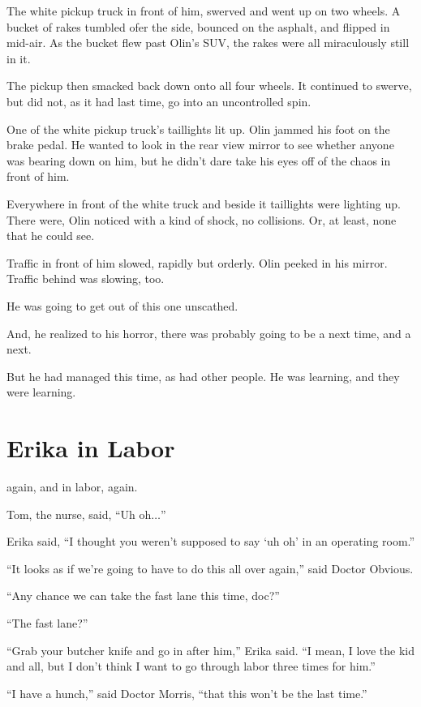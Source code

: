 The white pickup truck in front of him, swerved and went up on two wheels. A bucket of rakes tumbled ofer the side, bounced on the asphalt, and flipped in mid-air. As the bucket flew past Olin's SUV, the rakes were all miraculously still in it.

The pickup then smacked back down onto all four wheels. It continued to swerve, but did not, as it had last time, go into an uncontrolled spin.

One of the white pickup truck's taillights lit up. Olin jammed his foot on the brake pedal. He wanted to look in the rear view mirror to see whether anyone was bearing down on him, but he didn't dare take his eyes off of the chaos in front of him.

Everywhere in front of the white truck and beside it taillights were lighting up. There were, Olin noticed with a kind of shock, no collisions. Or, at least, none that he could see.

Traffic in front of him slowed, rapidly but orderly. Olin peeked in his mirror. Traffic behind was slowing, too.

He was going to get out of this one unscathed.

And, he realized to his horror, there was probably going to be a next time, and a next.

But he had managed this time, as had other people. He was learning, and they were learning.



\chapter{Erika in Labor}

 again, and in labor, again.

Tom, the nurse, said, ``Uh oh$\ldots$''

Erika said, ``I thought you weren't supposed to say `uh oh' in an operating room.''

``It looks as if we're going to have to do this all over again,'' said Doctor Obvious.

``Any chance we can take the fast lane this time, doc?''

``The fast lane?''

``Grab your butcher knife and go in after him,'' Erika said. ``I mean, I love the kid and all, but I don't think I want to go through labor three times for him.''

``I have a hunch,'' said Doctor Morris, ``that this won't be the last time.''

